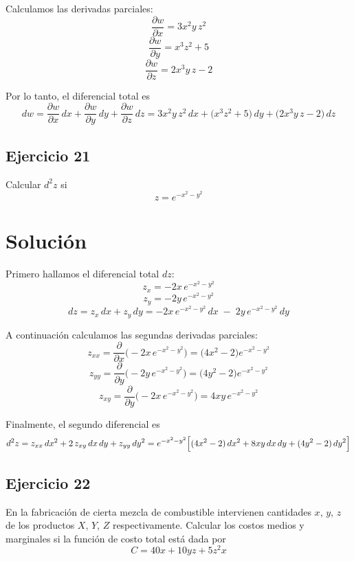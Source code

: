 \documentclass{article}
\begin{document}
Calculamos las derivadas parciales:
\[
\frac{\partial w}{\partial x}
=3x^2y\,z^2
\]
\[
\frac{\partial w}{\partial y}
=x^3z^2 + 5
\]
\[
\frac{\partial w}{\partial z}
=2x^3y\,z - 2
\]

Por lo tanto, el diferencial total es
{\color{teal}
\[
dw
=\frac{\partial w}{\partial x}\,dx
+\frac{\partial w}{\partial y}\,dy
+\frac{\partial w}{\partial z}\,dz
=3x^2y\,z^2\,dx
+\bigl(x^3z^2+5\bigr)\,dy
+\bigl(2x^3y\,z-2\bigr)\,dz
\]
}


\newpage
\subsection{Ejercicio 21}


Calcular \(d^2 z\) si 
\[
z = e^{-x^2 - y^2}
\]

\newpage
\section*{Solución}

Primero hallamos el diferencial total \(dz\):
\[
z_x = -2x\,e^{-x^2-y^2} 
\]
\[
z_y = -2y\,e^{-x^2-y^2}
\]
\[
dz = z_x\,dx + z_y\,dy
   = -2x\,e^{-x^2-y^2}\,dx \;-\;2y\,e^{-x^2-y^2}\,dy
\]

A continuación calculamos las segundas derivadas parciales:
\[
z_{xx} = \frac{\partial}{\partial x}\bigl(-2x\,e^{-x^2-y^2}\bigr)
       = \bigl(4x^2-2\bigr)e^{-x^2-y^2}
\]
\[
z_{yy} = \frac{\partial}{\partial y}\bigl(-2y\,e^{-x^2-y^2}\bigr)
       = \bigl(4y^2-2\bigr)e^{-x^2-y^2}
\]
\[
z_{xy} = \frac{\partial}{\partial y}\bigl(-2x\,e^{-x^2-y^2}\bigr)
       = 4xy\,e^{-x^2-y^2}
\]

Finalmente, el segundo diferencial es
{\color{teal}
\[
d^2z
= z_{xx}\,dx^2 + 2\,z_{xy}\,dx\,dy + z_{yy}\,dy^2
= e^{-x^2-y^2}\Bigl[(4x^2-2)\,dx^2 + 8xy\,dx\,dy + (4y^2-2)\,dy^2\Bigr]
\]
}

\newpage





\subsection{Ejercicio 22}



En la fabricación de cierta mezcla de combustible intervienen cantidades 
\(x\), \(y\), \(z\) de los productos \(X\), \(Y\), \(Z\) respectivamente. 
Calcular los costos medios y marginales si la función de costo total 
está dada por
\[
C = 40x + 10yz + 5z^2 x
\]
\end{document}

